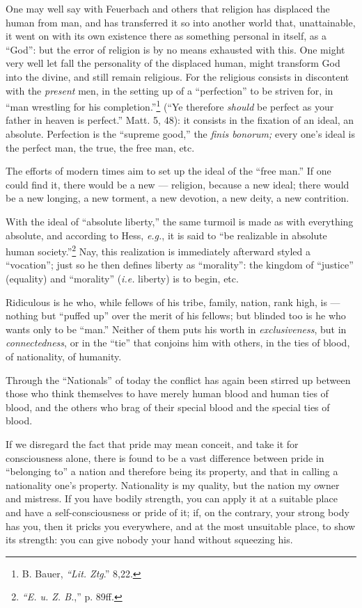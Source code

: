 One may well say with Feuerbach and others that religion has displaced the 
human from man, and has transferred it so into another world that, 
unattainable, it went on with its own existence there as something personal in 
itself, as a ``God'': but the error of religion is by no means exhausted 
with this. One might very well let fall the personality of the displaced 
human, might transform God into the divine, and still remain religious. For 
the religious consists in discontent with the \textit{present} men, in the 
setting up of a ``perfection'' to be striven for, in ``man wrestling for 
his completion.''\footnote{B. Bauer, \textit{``Lit. Ztg}.'' 8,22.} (``Ye 
therefore \textit{should} be perfect as your father in heaven is perfect.'' 
Matt. 5, 48): it consists in the fixation of an ideal, an absolute. Perfection 
is the ``supreme good,'' the \textit{finis bonorum;} every one's ideal is 
the perfect man, the true, the free man, etc.

The efforts of modern times aim to set up the ideal of the ``free man.'' If 
one could find it, there would be a new --- religion, because a new ideal; 
there would be a new longing, a new torment, a new devotion, a new deity, a 
new contrition.

With the ideal of ``absolute liberty,'' the same turmoil is made as with 
everything absolute, and according to Hess, \textit{e.g.}, it is said to 
``be realizable in absolute human society.''\footnote{\textit{``E. u. Z. 
B.},'' p. 89ff.} Nay, this realization is immediately afterward styled a 
``vocation''; just so he then defines liberty as ``morality'': the kingdom 
of ``justice'' (equality) and ``morality'' (\textit{i.e.} liberty) is to 
begin, etc.

Ridiculous is he who, while fellows of his tribe, family, nation, rank high, 
is --- nothing but ``puffed up'' over the merit of his fellows; but blinded 
too is he who wants only to be ``man.'' Neither of them puts his worth in 
\textit{exclusiveness}, but in \textit{connectedness}, or in the ``tie'' 
that conjoins him with others, in the ties of blood, of nationality, of 
humanity.

Through the ``Nationals'' of today the conflict has again been stirred up 
between those who think themselves to have merely human blood and human ties 
of blood, and the others who brag of their special blood and the special ties 
of blood.

If we disregard the fact that pride may mean conceit, and take it for 
consciousness alone, there is found to be a vast difference between pride in 
``belonging to'' a nation and therefore being its property, and that in 
calling a nationality one's property. Nationality is my quality, but the 
nation my owner and mistress. If you have bodily strength, you can apply it at 
a suitable place and have a self-consciousness or pride of it; if, on the 
contrary, your strong body has you, then it pricks you everywhere, and at the 
most unsuitable place, to show its strength: you can give nobody your hand 
without squeezing his.


